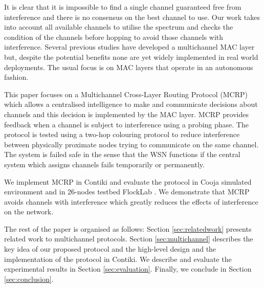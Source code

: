 It is clear that it is impossible to find a single channel guaranteed free from interference and there is no consensus on the best channel to use. Our work takes into account all available channels to utilise the spectrum and checks the condition of the channels before hopping to avoid those channels with interference. Several previous studies have developed a multichannel MAC layer but, despite the potential benefits none are yet widely implemented in real world deployments. The usual focus is on MAC layers that operate in an autonomous fashion. 

This paper focuses on a Multichannel Cross-Layer Routing Protocol (MCRP) which allows a centralised intelligence to make and communicate decisions about channels and this decision is implemented by the MAC layer. MCRP provides feedback when a channel is subject to interference using a probing phase. The protocol is tested using a two-hop colouring protocol to reduce interference between physically proximate nodes trying to communicate on the same channel. The system is failed safe in the sense that the WSN functions if the central system which assigns channels fails temporarily or permanently.

We implement MCRP in Contiki and evaluate the protocol in Cooja simulated environment and in 26-nodes testbed FlockLab \cite{flocklab}. We demonstrate that MCRP avoids channels with interference which greatly reduces the effects of interference on the network.

The rest of the paper is organised as follows: Section \ref{sec:relatedwork} presents related work to multichannel protocols. Section \ref{sec:multichannel} describes the key idea of our proposed protocol and the high-level design and the implementation of the protocol in Contiki. We describe and evaluate the experimental results in Section \ref{sec:evaluation}. Finally, we conclude in Section \ref{sec:conclusion}.